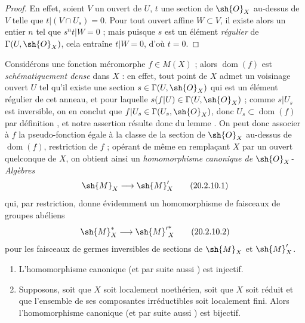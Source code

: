 \begin{proof}
En effet, soient $V$ un ouvert de $U$, $t$ une section de $\sh{O}_X$ au-dessus de $V$ telle que $t|(V\cap U_s)=0$.
Pour tout ouvert affine $W\subset V$, il existe alors un entier $n$ tel que $s^nt|W=0$  ; mais puisque $s$ est un élément \emph{régulier} de $\Gamma(U,\sh{O}_X)$, cela entraîne $t|W=0$, d'où $t=0$.
\end{proof}

\begin{env}[20.2.10]
\label{IV.20.2.10}
Considérons une fonction méromorphe $f\in M(X)$  ; alors $\operatorname{dom}(f)$ est \emph{schématiquement dense} dans $X$ : en effet, tout point de $X$ admet un voisinage ouvert $U$ tel qu'il existe une section $s\in\Gamma(U,\sh{O}_X)$ qui est un élément régulier de cet anneau, et pour laquelle $s(f|U)\in\Gamma(U,\sh{O}_X)$ ; comme $s|U_s$ est inversible, on en conclut que $f|U_s\in\Gamma(U_s,\sh{O}_X)$, donc $U_s\subset\operatorname{dom}(f)$ par définition , et notre assertion résulte donc du lemme .
On peut donc associer à $f$ la pseudo-fonction égale à la classe de la section de $\sh{O}_X$ au-dessus de $\operatorname{dom}(f)$, restriction de $f$ ; opérant de même en remplaçant $X$ par un ouvert quelconque de $X$, on obtient ainsi un \emph{homomorphisme canonique de $\sh{O}_X$-Algèbres}
\[
\label{IV.20.2.10.1}
  \sh{M}_X\to\sh{M}'_X
  \tag{20.2.10.1}
\]
qui, par restriction, donne évidemment un homomorphisme de faisceaux de groupes abéliens
\[
\label{IV.20.2.10.2}
  \sh{M}_X^*\to{\sh{M}'}^*_X
  \tag{20.2.10.2}
\]
pour les faisceaux de germes inversibles de sections de $\sh{M}_X$ et $\sh{M}'_X$.
\end{env}

\begin{proposition}[20.2.11]
\medskip
\begin{enumerate}[label=\emph{(\roman*)}]
  \item L'homomorphisme canonique \emph{} \textup{(et par suite aussi \emph{})} est injectif.
  \item Supposons, soit que $X$ soit localement noethérien, soit que $X$ soit réduit et que l'ensemble de ses composantes irréductibles soit localement fini.
  Alors l'homomorphisme canonique \emph{} \textup{(et par suite aussi \emph{})} est bijectif.
\end{enumerate}
\end{proposition}

